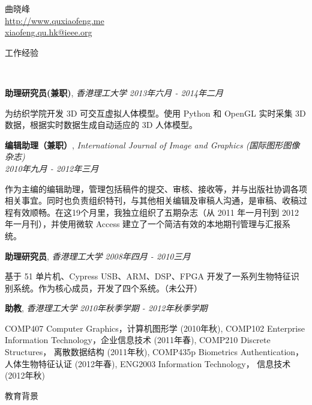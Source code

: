 \documentclass[9pt]{article}
\newenvironment{changemargin}[2]{%
  \begin{list}{}{%
    \setlength{\topsep}{0pt}%
    \setlength{\leftmargin}{#1}%
    \setlength{\rightmargin}{#2}%
    \setlength{\listparindent}{\parindent}%
    \setlength{\itemindent}{\parindent}%
    \setlength{\parsep}{\parskip}%
  }%
  \item[]}{\end{list}
}
\newcommand{\lineover}{
	\begin{changemargin}{-0.05in}{-0.05in}
		\vspace*{-8pt}
		\hrulefill \\
		\vspace*{-2pt}
	\end{changemargin}
}
\newcommand{\header}[1]{
	\begin{changemargin}{-0.5in}{-0.5in}
		\scshape{#1}\\
  	\lineover
	\end{changemargin}
}
\newcommand{\contact}[3]{
	\begin{changemargin}{-0.5in}{-0.5in}
		\begin{center}
			{\Large \scshape {#1}}\\ \smallskip
      {\url{#2}}\\ \smallskip 
      {\href{mailto:#3}{#3}}\\ \smallskip
		\end{center}
	\end{changemargin}
}
\newcommand{\jobtitle}[3]{
	\textbf{#1}, \emph{#2} \hfill \emph{#3}\\
}
\newcommand{\jobdescription}[1]{
	\begin{changemargin}{0.15in}{0.15in}
    \smallskip
		{#1}
    \medskip
	\end{changemargin}
}
\newenvironment{body} {
	\vspace*{-16pt}
	\begin{changemargin}{-0.25in}{-0.5in}
  }	
	{\end{changemargin}
}
\begin{document}
\contact{曲晓峰}{http://www.quxiaofeng.me}{xiaofeng.qu.hk@ieee.org}


\header{工作经验}

\begin{body}
  \vspace{14pt}

    \jobtitle{助理研究员(兼职)}{香港理工大学}{2013年六月 - 2014年二月}
    \jobdescription{
        为纺织学院开发 3D 可交互虚拟人体模型。使用 Python 和 OpenGL 实时采集 3D 数据，根据实时数据生成自动适应的 3D 人体模型。
    }

    \jobtitle{编辑助理（兼职）}{International Journal of Image and Graphics (国际图形图像杂志)\\}{2010年九月 - 2012年三月}
    \jobdescription{
        作为主编的编辑助理，管理包括稿件的提交、审核、接收等，并与出版社协调各项相关事宜。同时也负责组织特刊，与其他相关编辑及审稿人沟通，是审稿、收稿过程有效顺畅。在这19个月里，我独立组织了五期杂志（从 2011 年一月刊到 2012 年一月刊），并使用微软 Access 建立了一个简洁有效的本地期刊管理与汇报系统。
    }

	\jobtitle{助理研究员}{香港理工大学}{2008年四月 - 2010三月}
    \jobdescription{
        基于 51 单片机、Cypress USB、ARM、DSP、FPGA 开发了一系列生物特征识别系统。作为核心成员，开发了四个系统。（未公开）
    }

	\jobtitle{助教}{香港理工大学}{2010年秋季学期 - 2012年秋季学期}
    \jobdescription {
        COMP407 Computer Graphics，计算机图形学 (2010年秋),
        COMP102 Enterprise Information Technology，企业信息技术 (2011年春), 
        COMP210 Discrete Structures， 离散数据结构 (2011年秋),
        COMP435p Biometrics Authentication， 人体生物特征认证 (2012年春), 
        ENG2003 Information Technology， 信息技术 (2012年秋)
    }

\end{body}

\medskip


\header{教育背景}
\end{document}
